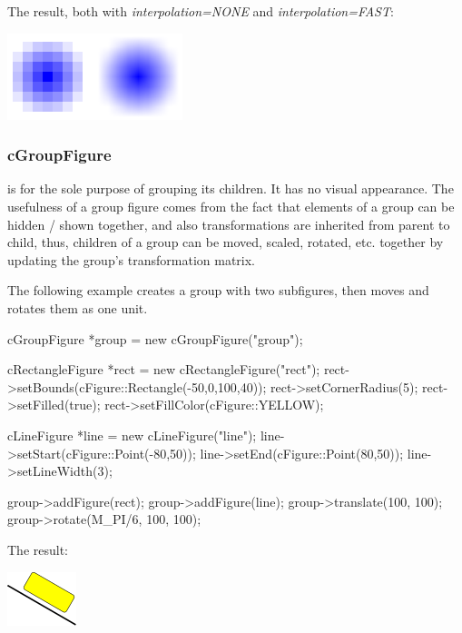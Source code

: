 
The result, both with \textit{interpolation=NONE} and \textit{interpolation=FAST}:

\begin{center}
\includegraphics{figures/figure-pixmaps} %
\end{center}


\subsubsection{cGroupFigure}

 is for the sole purpose of grouping its children. It
has no visual appearance. The usefulness of a group figure comes from the
fact that elements of a group can be hidden / shown together, and also
transformations are inherited from parent to child, thus, children of a
group can be moved, scaled, rotated, etc. together by updating the group's
transformation matrix.

The following example creates a group with two subfigures, then moves and
rotates them as one unit.

\begin{cpp}
cGroupFigure *group = new cGroupFigure("group");

cRectangleFigure *rect = new cRectangleFigure("rect");
rect->setBounds(cFigure::Rectangle(-50,0,100,40));
rect->setCornerRadius(5);
rect->setFilled(true);
rect->setFillColor(cFigure::YELLOW);

cLineFigure *line = new cLineFigure("line");
line->setStart(cFigure::Point(-80,50));
line->setEnd(cFigure::Point(80,50));
line->setLineWidth(3);

group->addFigure(rect);
group->addFigure(line);
group->translate(100, 100);
group->rotate(M_PI/6, 100, 100);
\end{cpp}


The result:

\begin{center}
\includegraphics[scale=4.0]{figures/figure-group}
\end{center}


